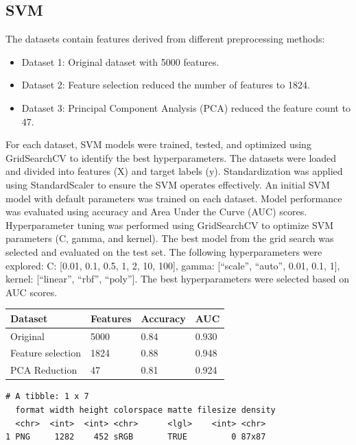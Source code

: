 \documentclass[
  12pt,
  letterpaper,
  DIV=11,
  numbers=noendperiod]{scrartcl}
\begin{document}
\subsection{SVM}\label{svm}

The datasets contain features derived from different preprocessing
methods:

\begin{itemize}
\item
  Dataset 1: Original dataset with 5000 features.
\item
  Dataset 2: Feature selection reduced the number of features to 1824.
\item
  Dataset 3: Principal Component Analysis (PCA) reduced the feature
  count to 47.
\end{itemize}

For each dataset, SVM models were trained, tested, and optimized using
GridSearchCV to identify the best hyperparameters. The datasets were
loaded and divided into features (X) and target labels (y).
Standardization was applied using StandardScaler to ensure the SVM
operates effectively. An initial SVM model with default parameters was
trained on each dataset. Model performance was evaluated using accuracy
and Area Under the Curve (AUC) scores. Hyperparameter tuning was
performed using GridSearchCV to optimize SVM parameters (C, gamma, and
kernel). The best model from the grid search was selected and evaluated
on the test set. The following hyperparameters were explored: C:
{[}0.01, 0.1, 0.5, 1, 2, 10, 100{]}, gamma: {[}``scale'', ``auto'',
0.01, 0.1, 1{]}, kernel: {[}``linear'', ``rbf'', ``poly''{]}. The best
hyperparameters were selected based on AUC scores.

\begin{longtable}[]{@{}llll@{}}
\toprule\noalign{}
Dataset & Features & Accuracy & AUC \\
\midrule\noalign{}
\endhead
\bottomrule\noalign{}
\endlastfoot
Original & 5000 & 0.84 & 0.930 \\
Feature selection & 1824 & 0.88 & 0.948 \\
PCA Reduction & 47 & 0.81 & 0.924 \\
\end{longtable}

\begin{verbatim}
# A tibble: 1 x 7
  format width height colorspace matte filesize density
  <chr>  <int>  <int> <chr>      <lgl>    <int> <chr>  
1 PNG     1282    452 sRGB       TRUE         0 87x87  
\end{verbatim}
\end{document}
